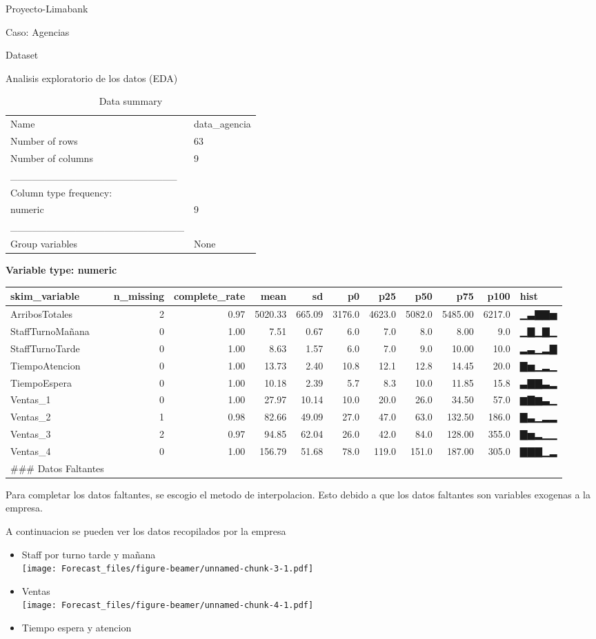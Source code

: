 \documentclass[
  ignorenonframetext,
]{beamer}
\begin{document}
\begin{frame}[fragile]{Proyecto-Limabank}
\begin{block}{Caso: Agencias}
\begin{block}{Dataset}
\end{block}

\begin{block}{Analisis exploratorio de los datos (EDA)}

\begin{longtable}[]{@{}ll@{}}
\caption{Data summary}\tabularnewline
\toprule
\endhead
Name & data\_agencia\tabularnewline
Number of rows & 63\tabularnewline
Number of columns & 9\tabularnewline
\_\_\_\_\_\_\_\_\_\_\_\_\_\_\_\_\_\_\_\_\_\_\_ &\tabularnewline
Column type frequency: &\tabularnewline
numeric & 9\tabularnewline
\_\_\_\_\_\_\_\_\_\_\_\_\_\_\_\_\_\_\_\_\_\_\_\_ &\tabularnewline
Group variables & None\tabularnewline
\bottomrule
\end{longtable}

\textbf{Variable type: numeric}

\begin{longtable}[]{@{}lrrrrrrrrrl@{}}
\toprule
skim\_variable & n\_missing & complete\_rate & mean & sd & p0 & p25 &
p50 & p75 & p100 & hist\tabularnewline
\midrule
\endhead
ArribosTotales & 2 & 0.97 & 5020.33 & 665.09 & 3176.0 & 4623.0 & 5082.0
& 5485.00 & 6217.0 & ▁▃▇▇▅\tabularnewline
StaffTurnoMañana & 0 & 1.00 & 7.51 & 0.67 & 6.0 & 7.0 & 8.0 & 8.00 & 9.0
& ▁▇▁▇▁\tabularnewline
StaffTurnoTarde & 0 & 1.00 & 8.63 & 1.57 & 6.0 & 7.0 & 9.0 & 10.00 &
10.0 & ▂▃▁▂▇\tabularnewline
TiempoAtencion & 0 & 1.00 & 13.73 & 2.40 & 10.8 & 12.1 & 12.8 & 14.45 &
20.0 & ▇▅▁▂▁\tabularnewline
TiempoEspera & 0 & 1.00 & 10.18 & 2.39 & 5.7 & 8.3 & 10.0 & 11.85 & 15.8
& ▃▇▇▃▂\tabularnewline
Ventas\_1 & 0 & 1.00 & 27.97 & 10.14 & 10.0 & 20.0 & 26.0 & 34.50 & 57.0
& ▆▇▆▃▁\tabularnewline
Ventas\_2 & 1 & 0.98 & 82.66 & 49.09 & 27.0 & 47.0 & 63.0 & 132.50 &
186.0 & ▇▃▁▂▂\tabularnewline
Ventas\_3 & 2 & 0.97 & 94.85 & 62.04 & 26.0 & 42.0 & 84.0 & 128.00 &
355.0 & ▇▅▂▁▁\tabularnewline
Ventas\_4 & 0 & 1.00 & 156.79 & 51.68 & 78.0 & 119.0 & 151.0 & 187.00 &
305.0 & ▇▇▇▁▂\tabularnewline
\#\#\# Datos Faltantes & & & & & & & & & &\tabularnewline
\bottomrule
\end{longtable}

Para completar los datos faltantes, se escogio el metodo de
interpolacion. Esto debido a que los datos faltantes son variables
exogenas a la empresa.

A continuacion se pueden ver los datos recopilados por la empresa

\begin{itemize}
\item
  Staff por turno tarde y mañana\\
  \texttt{[image: Forecast\_files/figure-beamer/unnamed-chunk-3-1.pdf]}
\item
  Ventas\\
  \texttt{[image: Forecast\_files/figure-beamer/unnamed-chunk-4-1.pdf]}
\item
  Tiempo espera y atencion
\end{itemize}


\end{block}
\end{block}
\end{frame}
\end{document}
